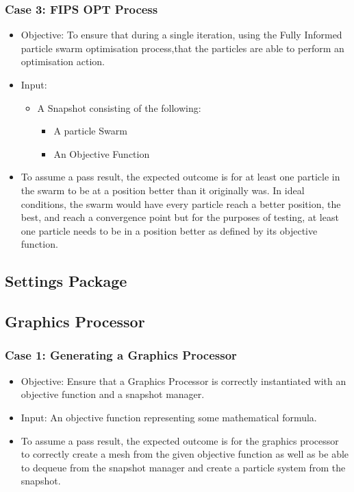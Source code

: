 \documentclass[11pt]{article}
\begin{document}
\subsubsection{Case 3: FIPS OPT Process}
\begin{itemize}
    \item Objective: To ensure that during a single iteration, using the Fully Informed particle swarm optimisation process,that the particles are able to perform an optimisation action.
    \item Input: \begin{itemize}
    \item A Snapshot consisting of the following:
    	\begin{itemize}
    	\item A particle Swarm
    	\item An Objective Function
    	\end{itemize}
    \end{itemize}
    \item To assume a pass result, the expected outcome is for at least one particle in the swarm to be at a position better than it originally was. In ideal conditions, the swarm would have every particle reach a better position, the best, and reach a convergence point but for the purposes of testing, at least one particle needs to be in a position better as defined by its objective function.
\end{itemize}
\subsection{Settings Package}

\subsection{Graphics Processor}
\subsubsection{Case 1: Generating a Graphics Processor}
\begin{itemize}
	\item Objective: Ensure that a Graphics Processor is correctly instantiated with an objective function and a snapshot manager.
	\item Input: An objective function representing some mathematical formula.
	\item To assume a pass result, the expected outcome is for the graphics processor to correctly create a mesh from the given objective function as well as be able to dequeue from the snapshot manager and create a particle system from the snapshot.
\end{itemize}
\end{document}
